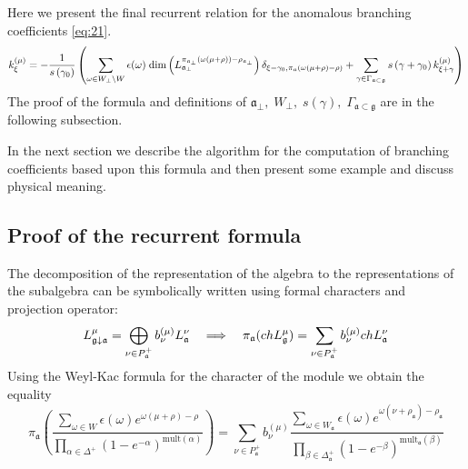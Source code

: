 \documentclass[a4paper,12pt]{article}
\theoremstyle{definition} \newtheorem{Def}{Definition}
\begin{document}
Here we present the final recurrent relation for the anomalous branching coefficients \eqref{eq:21}. 
\begin{equation}
  \label{eq:1}
k_{\xi }^{\left( \mu \right) }=-\frac{1}{s\left( \gamma _{0}\right) }\left(
  \sum_{\omega\in W_{\bot}\backslash W} \epsilon(\omega)\; {\rm dim}\left(L^{\pi_{\mathfrak{a}_{\bot}}(\omega(\mu+\rho))-\rho_{\mathfrak{a}_{\bot}}}_{\mathfrak{a}_{\bot}}\right) \delta_{\xi-\gamma_0,\pi_{\mathfrak{a}}(\omega(\mu+\rho)-\rho)}+
\sum_{\gamma \in
\Gamma _{\frak{a}\subset \frak{g}}}s\left( \gamma +\gamma _{0}\right) k_{\xi
+\gamma }^{\left( \mu \right) }\right)   
\end{equation}
The proof of the formula and definitions of $\mathfrak{a}_{\bot},\; W_{\bot},\; s(\gamma),\; \Gamma_{\mathfrak{a}\subset \mathfrak{g}}$ are in the following subsection.

In the next section we describe the algorithm for the computation of branching coefficients based upon this formula and then present some example and discuss physical meaning.

\subsection{Proof of the recurrent formula}
\label{sec:proof}

The decomposition of the representation of the algebra to the representations of the subalgebra can be symbolically written using formal characters and projection operator:
\begin{equation}
  \label{eq:3}
  L_{\frak{g}\downarrow \frak{a}}^{\mu }=\bigoplus\limits_{\nu \in P_{\frak{a}%
    }^{+}}b_{\nu }^{\left( \mu \right) }L_{\frak{a}}^{\nu }\quad
  \Longrightarrow\quad
  \pi_{\mathfrak{a}}(ch L^{\mu}_{\mathfrak{g}})=\sum_{\nu\in P^{+}_{\mathfrak{a}}}b^{(\mu)}_{\nu} ch L^{\nu}_{\mathfrak{a}}
\end{equation}
Using the Weyl-Kac formula for the character of the module
we obtain the equality
\begin{equation}
  \label{eq:4}
  \pi_{\mathfrak{a}}\left(\frac{\sum_{\omega\in W} \epsilon(\omega) e^{\omega(\mu+\rho)-\rho}}{\prod_{\alpha\in\Delta^{+}}(1-e^{-\alpha})^{\mathrm{mult}(\alpha)}}\right) = 
  \sum_{\nu\in P^{+}_{\mathfrak{a}}}b^{(\mu)}_{\nu}
  \frac{\sum_{\omega\in W_{\mathfrak{a}}}\epsilon(\omega)e^{\omega(\nu+\rho_{\mathfrak{a}})-\rho_{\mathfrak{a}}}}{\prod_{\beta\in \Delta_{\mathfrak{a}}^{+}}(1-e^{-\beta})^{\mathrm{mult}_{\mathfrak{a}}(\beta)}}
\end{equation}
\end{document}
